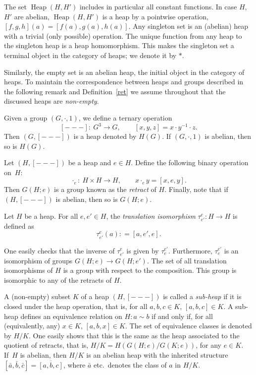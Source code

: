 \documentclass[pdftex]{sigma}
\numberwithin{equation}{section}
\newcommand{\heap}{\operatorname{Heap}}
\begin{document}
The set $\heap(H,H')$ includes in particular all constant functions.
In case $H$, $H'$ are abelian, $\heap(H,H')$ is a heap by a pointwise operation, $[f,g,h](a) = [f(a),g(a),h(a)]$. Any singleton set is an (abelian) heap with a trivial (only possible) operation. The unique function from any heap to the singleton heap is a heap homomorphism. This makes the singleton set a terminal object in the category of heaps; we denote it by $\ast$.

Similarly, the empty set is an abelian heap, the initial object in the category of heaps. To maintain the correspondence between heaps and groups described in the following remark and Definition~\ref{ret} we assume throughout that the discussed heaps are {\em non-empty}.
\begin{Remark}
Given a group $(G,\cdot,1)$, we define a ternary operation
\[ [---]\colon\ G^3 \rightarrow G, \qquad [x,y,z] = x \cdot y^{-1} \cdot z.\]
 Then $(G,[---])$ is a heap denoted by $H(G)$. If $(G,\cdot,1)$ is abelian, then so is $H(G)$.
\end{Remark}
\begin{Definition} \label{ret}
Let $(H,[---])$ be a heap and $e \in H$. Define the following binary operation on~$H$:
\[\cdot_e \colon\ H \times H \rightarrow H, \qquad x \cdot_e y = [x,e,y]. \]
 Then $G(H;e)$ is a group known as the \textit{retract} of $H$. Finally, note that if $(H,[---])$ is abelian, then so is $G(H;e)$.
\end{Definition}
\begin{Definition}
Let $H$ be a heap. For all $e,e'\in H$, the \textit{translation isomorphism} $\tau^{e}_{e'}\colon H\to H$ is defined as
\[
\tau^{e}_{e'}(a) : = [a,e',e].
\]
\end{Definition}
One easily checks that the inverse of $\tau^{e}_{e'}$ is given by $\tau^{e'}_{e}$. Furthermore, $\tau^{e'}_{e}$ is an isomorphism of groups $G(H;e)\to G(H;e')$. The set of all translation isomorphisms of $H$ is a group with respect to the composition. This group is isomorphic to any of the retracts of $H$.

A (non-empty) subset $K$ of a heap $(H,[---])$ is called a \textit{sub-heap} if it is closed under the heap operation, that is, for all $a,b,c\in K$, $[a,b,c]\in K$. A sub-heap defines an equivalence relation on $H\colon a\sim b$ if and only if, for all (equivalently, any) $x\in K$, $[a,b,x]\in K$. The set of equivalence classes is denoted by $H/K$. One easily shows that this is the same as the heap associated to the quotient of retracts, that is, $H/K = H(G(H;e)/G(K;e))$, for any $e\in K$. If~$H$ is abelian, then $H/K$ is an abelian heap with the inherited structure $[\bar{a},\bar{b},\bar{c}] = \overline{[a,b,c]}$, where $\bar{a}$ etc.\ denotes the class of $a$ in $H/K$.
\end{document}
